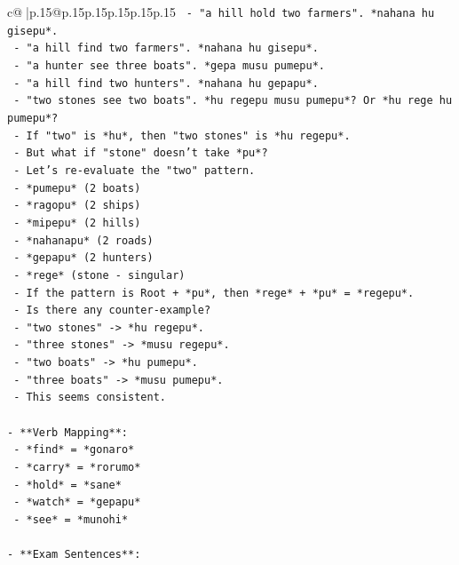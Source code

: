 \documentclass{article}
\begin{document}
{\begin{supertabular}{c@{$\;$}|p{.15\linewidth}@{}p{.15\linewidth}p{.15\linewidth}p{.15\linewidth}p{.15\linewidth}p{.15\linewidth}}
{{{\texttt{    {-} "a hill hold two farmers". *nahana hu gisepu*.} \\
\texttt{    {-} "a hill find two farmers". *nahana hu gisepu*.} \\
\texttt{    {-} "a hunter see three boats". *gepa musu pumepu*.} \\
\texttt{    {-} "a hill find two hunters". *nahana hu gepapu*.} \\
\texttt{    {-} "two stones see two boats". *hu regepu musu pumepu*? Or *hu rege hu pumepu*?} \\
\texttt{    {-} If "two" is *hu*, then "two stones" is *hu regepu*.} \\
\texttt{    {-} But what if "stone" doesn't take *pu*?} \\
\texttt{    {-} Let's re{-}evaluate the "two" pattern.} \\
\texttt{    {-} *pumepu* (2 boats)} \\
\texttt{    {-} *ragopu* (2 ships)} \\
\texttt{    {-} *mipepu* (2 hills)} \\
\texttt{    {-} *nahanapu* (2 roads)} \\
\texttt{    {-} *gepapu* (2 hunters)} \\
\texttt{    {-} *rege* (stone {-} singular)} \\
\texttt{    {-} If the pattern is Root + *pu*, then *rege* + *pu* = *regepu*.} \\
\texttt{    {-} Is there any counter{-}example?} \\
\texttt{    {-} "two stones" {-}> *hu regepu*.} \\
\texttt{    {-} "three stones" {-}> *musu regepu*.} \\
\texttt{    {-} "two boats" {-}> *hu pumepu*.} \\
\texttt{    {-} "three boats" {-}> *musu pumepu*.} \\
\texttt{    {-} This seems consistent.} \\
\\ 
\texttt{{-} **Verb Mapping**:} \\
\texttt{  {-} *find* = *gonaro*} \\
\texttt{  {-} *carry* = *rorumo*} \\
\texttt{  {-} *hold* = *sane*} \\
\texttt{  {-} *watch* = *gepapu*} \\
\texttt{  {-} *see* = *munohi*} \\
\\ 
\texttt{{-} **Exam Sentences**:} \\
}}}
\end{supertabular}}
\end{document}
